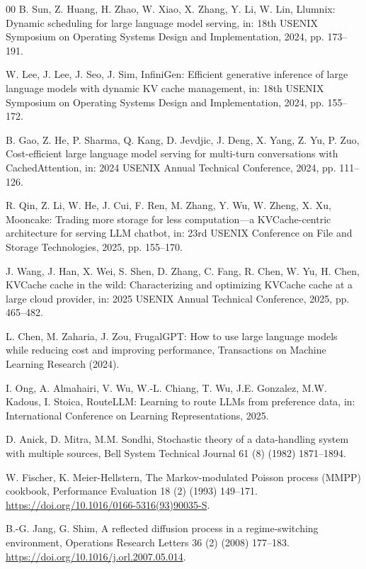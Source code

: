 \documentclass[preprint,12pt]{elsarticle}
\begin{document}
\begin{thebibliography}{00}
B. Sun, Z. Huang, H. Zhao, W. Xiao, X. Zhang, Y. Li, W. Lin,
Llumnix: Dynamic scheduling for large language model serving,
in: 18th USENIX Symposium on Operating Systems Design and Implementation, 2024, pp. 173--191.

W. Lee, J. Lee, J. Seo, J. Sim,
InfiniGen: Efficient generative inference of large language models with dynamic KV cache management,
in: 18th USENIX Symposium on Operating Systems Design and Implementation, 2024, pp. 155--172.

B. Gao, Z. He, P. Sharma, Q. Kang, D. Jevdjic, J. Deng, X. Yang, Z. Yu, P. Zuo,
Cost-efficient large language model serving for multi-turn conversations with CachedAttention,
in: 2024 USENIX Annual Technical Conference, 2024, pp. 111--126.

R. Qin, Z. Li, W. He, J. Cui, F. Ren, M. Zhang, Y. Wu, W. Zheng, X. Xu,
Mooncake: Trading more storage for less computation---a KVCache-centric architecture for serving LLM chatbot,
in: 23rd USENIX Conference on File and Storage Technologies, 2025, pp. 155--170.

J. Wang, J. Han, X. Wei, S. Shen, D. Zhang, C. Fang, R. Chen, W. Yu, H. Chen,
KVCache cache in the wild: Characterizing and optimizing KVCache cache at a large cloud provider,
in: 2025 USENIX Annual Technical Conference, 2025, pp. 465--482.

L. Chen, M. Zaharia, J. Zou,
FrugalGPT: How to use large language models while reducing cost and improving performance,
Transactions on Machine Learning Research (2024).

I. Ong, A. Almahairi, V. Wu, W.-L. Chiang, T. Wu, J.E. Gonzalez, M.W. Kadous, I. Stoica,
RouteLLM: Learning to route LLMs from preference data,
in: International Conference on Learning Representations, 2025.

D. Anick, D. Mitra, M.M. Sondhi,
Stochastic theory of a data-handling system with multiple sources,
Bell System Technical Journal 61 (8) (1982) 1871--1894.

W. Fischer, K. Meier-Hellstern,
The Markov-modulated Poisson process (MMPP) cookbook,
Performance Evaluation 18 (2) (1993) 149--171.
\newblock \url{https://doi.org/10.1016/0166-5316(93)90035-S}.

B.-G. Jang, G. Shim,
A reflected diffusion process in a regime-switching environment,
Operations Research Letters 36 (2) (2008) 177--183.
\newblock \url{https://doi.org/10.1016/j.orl.2007.05.014}.


\end{thebibliography}
\end{document}
